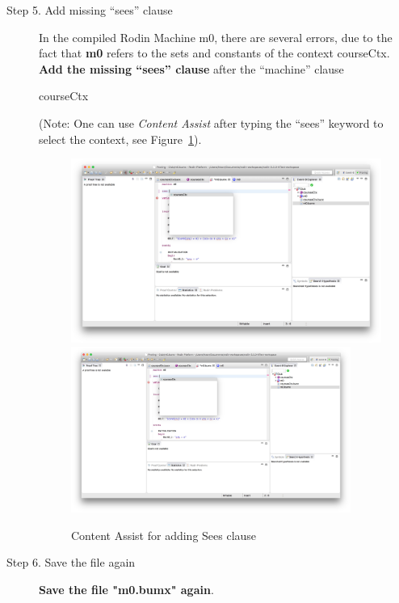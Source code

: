 \begin{description}
\item[Step 5. Add missing ``sees'' clause] In the compiled Rodin Machine m0, there are several errors, due to the fact that \textbf{m0} refers to the sets and constants of the context courseCtx.
  \textbf{Add the missing ``sees'' clause} after the ``machine'' clause
  \begin{center}
    \begin{Bcode}
      \Bsees{} courseCtx
    \end{Bcode}
  \end{center}
  (Note: One can use \emph{Content Assist} after typing the ``sees'' keyword to select the context, see Figure~\ref{fig:SeesCoursesCtx}).
  \begin{figure}[!htbp]
    \centering
    \ifplastex
    \includegraphics[width=512]{figures/SeesCoursesCtx}
    \else
    \includegraphics[width=0.9\textwidth]{figures/SeesCoursesCtx}
    \fi
    \caption{Content Assist for adding Sees clause}
    \label{fig:SeesCoursesCtx}
  \end{figure}

\item[Step 6. Save the file again] \textbf{Save the file "m0.bumx" again}.
\end{description}
